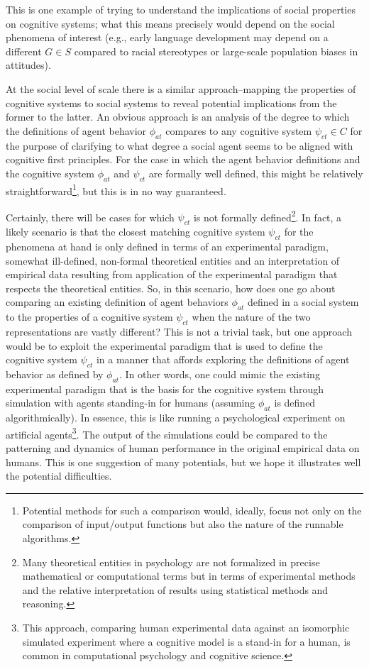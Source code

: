 \documentclass{article}
\begin{document}
This is one example of trying to understand the implications of social properties on cognitive systems; what this means precisely would depend on the social phenomena of interest (e.g., early language development may depend on a different $G \in S$ compared to racial stereotypes or large-scale population biases in attitudes).  

At the social level of scale there is a similar approach--mapping the properties of cognitive systems to social systems to reveal potential implications from the former to the latter.  An obvious approach is an analysis of the degree to which the definitions of agent behavior $\phi_{at}$ compares to any cognitive system $\psi_{ct} \in C$ for the purpose of clarifying to what degree a social agent seems to be aligned with cognitive first principles.  For the case in which the agent behavior definitions and the cognitive system $\phi_{at}$ and $\psi_{ct}$ are formally well defined, this might be relatively straightforward\footnote{Potential methods for such a comparison would, ideally, focus not only on the comparison of input/output functions but also the nature of the runnable algorithms.}, but this is in no way guaranteed. 

Certainly, there will be cases for which $\psi_{ct}$ is not formally defined\footnote{Many theoretical entities in psychology are not formalized in precise mathematical or computational terms but in terms of experimental methods and the relative interpretation of results using statistical methods and reasoning.}.  In fact, a likely scenario is that the closest matching cognitive system $\psi_{ct}$ for the phenomena at hand is only defined in terms of an experimental paradigm, somewhat ill-defined, non-formal theoretical entities and an interpretation of empirical data resulting from application of the experimental paradigm that respects the theoretical entities.  So, in this scenario, how does one go about comparing an existing definition of agent behaviors $\phi_{at}$ defined in a social system to the properties of a cognitive system $\psi_{ct}$ when the nature of the two representations are vastly different?  This is not a trivial task, but one approach would be to exploit the experimental paradigm that is used to define the cognitive system $\psi_{ct}$ in a manner that affords exploring the definitions of agent behavior as defined by $\phi_{at}$.  In other words, one could mimic the existing experimental paradigm that is the basis for the cognitive system through simulation with agents standing-in for humans (assuming $\phi_{at}$ is defined algorithmically).  In essence, this is like running a psychological experiment on artificial agents\footnote{This approach, comparing human experimental data against an isomorphic simulated experiment where a cognitive model is a stand-in for a human, is common in computational psychology and cognitive science.}.  The output of the simulations could be compared to the patterning and dynamics of human performance in the original  empirical data on humans.  This is one suggestion of many potentials, but we hope it illustrates well the potential difficulties.  
  
\end{document}
